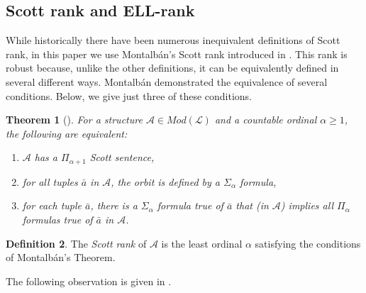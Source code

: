\documentclass[10pt,a4paper]{article}
\newcommand{\ELL}{\textnormal{ELL}}
\newtheorem{thm}{Theorem}[section]
\theoremstyle{definition}
\newtheorem{defn}[thm]{Definition}
\begin{document}
	\subsection{Scott rank and \ELL-rank}
	
	While historically there have been numerous inequivalent definitions of Scott rank, in this paper we use Montalb\'{a}n's Scott rank introduced in \cite{robuster}. This rank is robust because, unlike the other definitions, it can be equivalently defined in several different ways. Montalb\'{a}n demonstrated the equivalence of several conditions. Below, we give just three of these conditions. 
	
	\begin{thm} [\cite{robuster}]
		
		For a structure $\mathcal{A}\in Mod(\mathcal{L})$ and a countable ordinal $\alpha\geq 1$, the following are equivalent: 
		
		\begin{enumerate}
			
			\item $\mathcal{A}$ has a $\Pi_{\alpha+1}$ Scott sentence,
			
			\item for all tuples $\bar{a}$ in $\mathcal{A}$, the orbit is defined by a $\Sigma_\alpha$ formula,
			
			\item for each tuple $\bar{a}$, there is a $\Sigma_\alpha$ formula true of $\bar{a}$ that (in $\mathcal{A}$) implies all $\Pi_\alpha$ formulas true of $\bar{a}$ in $\mathcal{A}$. 
			
		\end{enumerate}
		
	\end{thm}
	
	\begin{defn}
		
		The \emph{Scott rank} of $\mathcal{A}$ is the least ordinal $\alpha$ satisfying the conditions of Montalb\'{a}n's Theorem.
		
	\end{defn}
	
	The following observation is given in \cite{GonzalezKnight}.
	
\end{document}
